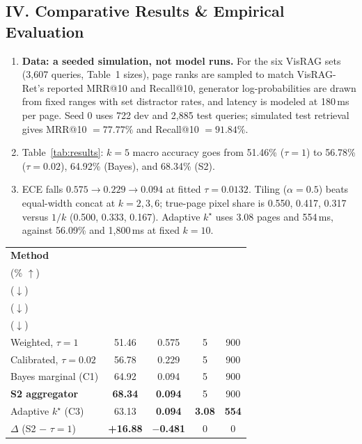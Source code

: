 \documentclass[8pt,a4paper]{article}
\begin{document}
\subsection*{IV. Comparative Results \& Empirical Evaluation}
\begin{enumerate}
    \item \textbf{Data: a seeded simulation, not model runs.} For the six VisRAG sets (3{,}607 queries, Table~1 sizes), page ranks are sampled to match VisRAG-Ret's reported MRR@10 and Recall@10, generator log-probabilities are drawn from fixed ranges with set distractor rates, and latency is modeled at 180\,ms per page. Seed 0 uses 722 dev and 2{,}885 test queries; simulated test retrieval gives MRR@10 $=77.77\%$ and Recall@10 $=91.84\%$.
    \item Table~\ref{tab:results}: $k{=}5$ macro accuracy goes from 51.46\% ($\tau{=}1$) to 56.78\% ($\tau{=}0.02$), 64.92\% (Bayes), and 68.34\% (S2).
    \item ECE falls $0.575\to 0.229\to 0.094$ at fitted $\tau{=}0.0132$. Tiling ($\alpha{=}0.5$) beats equal-width concat at $k{=}2,3,6$; true-page pixel share is 0.550, 0.417, 0.317 versus $1/k$ (0.500, 0.333, 0.167). Adaptive $k^{\star}$ uses 3.08 pages and 554\,ms, against 56.09\% and 1{,}800\,ms at fixed $k{=}10$.
\end{enumerate}

\begin{center}
\label{tab:results}
\small
\begin{tabularx}{\linewidth}{@{}X c c c c@{}}
\toprule
\textbf{Method}
& \makecell{\textbf{Acc.}\\(\% $\uparrow$)}
& \makecell{\textbf{ECE}\\($\downarrow$)}
& \makecell{\textbf{Pages}\\($\downarrow$)}
& \makecell{\textbf{ms}\\($\downarrow$)}\\
\midrule
Weighted, $\tau{=}1$
& 51.46 & 0.575 & 5 & 900\\
Calibrated, $\tau{=}0.02$
& 56.78 & 0.229 & 5 & 900\\
Bayes marginal (C1)
& 64.92 & 0.094 & 5 & 900\\
\textbf{S2 aggregator}
& \textbf{68.34} & \textbf{0.094} & 5 & 900\\
Adaptive $k^{\star}$ (C3)
& 63.13 & \textbf{0.094} & \textbf{3.08} & \textbf{554}\\
\midrule
$\Delta$ (S2 $-$ $\tau{=}1$)
& \textbf{+16.88} & \textbf{$-$0.481} & 0 & 0\\
\bottomrule
\end{tabularx}
\end{center}
\end{document}

